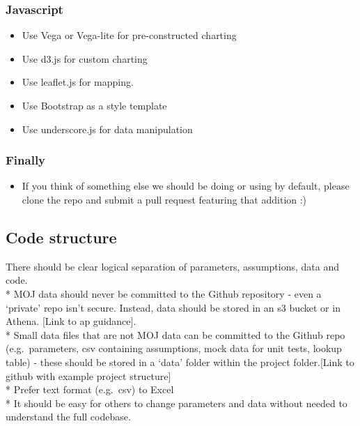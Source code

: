 \documentclass[]{book}
\providecommand{\tightlist}{%
  \setlength{\itemsep}{0pt}\setlength{\parskip}{0pt}}
\begin{document}
\hypertarget{javascript}{%
\subsubsection*{Javascript}\label{javascript}}

\begin{itemize}
\tightlist
\item
  Use Vega or Vega-lite for pre-constructed charting
\item
  Use d3.js for custom charting
\item
  Use leaflet.js for mapping.
\item
  Use Bootstrap as a style template
\item
  Use underscore.js for data manipulation
\end{itemize}

\hypertarget{finally}{%
\subsubsection*{Finally}\label{finally}}

\begin{itemize}
\tightlist
\item
  If you think of something else we should be doing or using by default, please clone the repo and submit a pull request featuring that addition :)
\end{itemize}

\hypertarget{structure2}{%
\subsection{Code structure}\label{structure2}}

There should be clear logical separation of parameters, assumptions, data and code.\\
* MOJ data should never be committed to the Github repository - even a `private' repo isn't secure. Instead, data should be stored in an s3 bucket or in Athena. {[}Link to ap guidance{]}.\\
* Small data files that are not MOJ data can be committed to the Github repo (e.g.~parameters, csv containing assumptions, mock data for unit tests, lookup table) - these should be stored in a `data' folder within the project folder.{[}Link to github with example project structure{]}\\
* Prefer text format (e.g.~csv) to Excel\\
* It should be easy for others to change parameters and data without needed to understand the full codebase.
\end{document}
